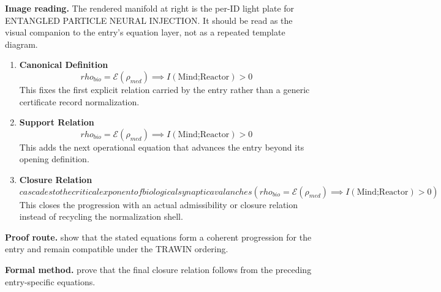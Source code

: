 \begin{samepage}
\noindent\begin{minipage}[t]{0.45\linewidth}
\vspace{0pt}
\raggedright
\scriptsize\textbf{Image reading.} The rendered manifold at right is the per-ID light plate for ENTANGLED PARTICLE NEURAL INJECTION. It should be read as the visual companion to the entry's equation layer, not as a repeated template diagram.\par
\end{minipage}\hfill
\begin{minipage}[t]{0.53\linewidth}
\vspace*{-0.10in}
\raggedright
{}
\end{minipage}
\end{samepage}

\clearpage


\begin{enumerate}[leftmargin=1.6em,itemsep=9pt,topsep=6pt]
\item \textbf{Canonical Definition}
\[
rho_{bio} = \mathcal{E}(\rho_{med}) \implies I(\text{Mind;Reactor}) > 0
\]
This fixes the first explicit relation carried by the entry rather than a generic certificate record normalization.

\item \textbf{Support Relation}
\[
rho_{bio} = \mathcal{E}(\rho_{med}) \implies I(\text{Mind;Reactor}) > 0
\]
This adds the next operational equation that advances the entry beyond its opening definition.

\item \textbf{Closure Relation}
\[
cascades to the critical exponent of biological synaptic avalanches (rho_{bio} = \mathcal{E}(\rho_{med}) \implies I(\text{Mind;Reactor}) > 0)
\]
This closes the progression with an actual admissibility or closure relation instead of recycling the normalization shell.
\end{enumerate}

\textbf{Proof route.} show that the stated equations form a coherent progression for the entry and remain compatible under the TRAWIN ordering.

\textbf{Formal method.} prove that the final closure relation follows from the preceding entry-specific equations.

